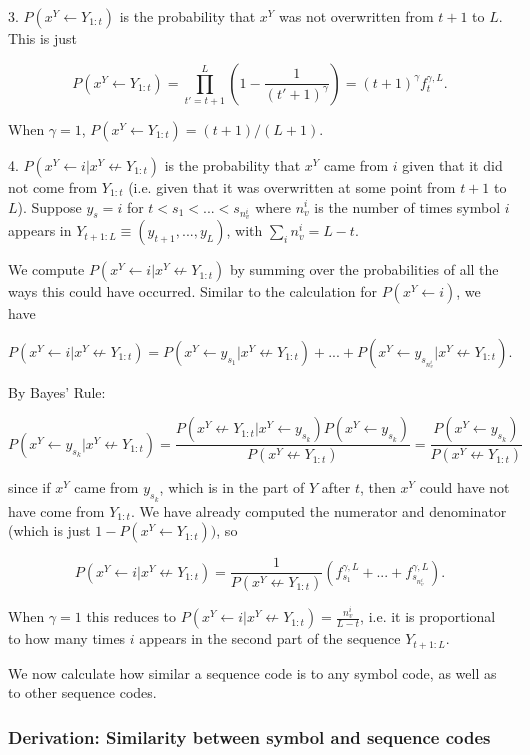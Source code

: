 \documentclass{article}
\begin{document}
3. $P(x^Y \leftarrow Y_{1:t})$ is the probability that $x^Y$ was not overwritten from $t+1$ to $L$. This is just

$$P(x^Y \leftarrow Y_{1:t}) = \prod\limits_{t' = t+1}^L \left(1 - \frac{1}{(t'+1)^\gamma}\right) = (t+1)^\gamma f^{\gamma,L}_t.$$

When $\gamma = 1$, $P(x^Y \leftarrow Y_{1:t}) = (t+1)/(L+1)$.

4. $P(x^Y \leftarrow i|x^Y \not \leftarrow Y_{1:t})$ is the probability that $x^Y$ came from $i$ given that it did not come from $Y_{1:t}$ (i.e. given that it was overwritten at some point from $t+1$ to $L$). Suppose $y_s = i$ for $t < s_1 < ... < s_{n^i_v}$ where $n^i_v$ is the number of times symbol $i$ appears in $Y_{t+1:L} \equiv (y_{t+1}, ..., y_L)$, with $\sum\limits_i n^i_v = L-t$.

We compute $P(x^Y \leftarrow i|x^Y \not \leftarrow Y_{1:t})$ by summing over the probabilities of all the ways this could have occurred. Similar to the calculation for $P(x^Y \leftarrow i)$, we have

$$P(x^Y \leftarrow i|x^Y \not \leftarrow Y_{1:t}) = P(x^Y \leftarrow y_{s_1}| x^Y \not \leftarrow Y_{1:t}) + ... + P(x^Y \leftarrow y_{s_{n^i_v}}| x^Y \not \leftarrow Y_{1:t}).$$

By Bayes' Rule:

$$P(x^Y \leftarrow y_{s_k}| x^Y \not \leftarrow Y_{1:t}) = \frac{P(x^Y \not \leftarrow Y_{1:t}| x^Y \leftarrow y_{s_k})P(x^Y \leftarrow y_{s_k})}{P(x^Y \not\leftarrow Y_{1:t})} = \frac{P(x^Y \leftarrow y_{s_k})}{P(x^Y \not\leftarrow Y_{1:t})}$$

since if $x^Y$ came from $y_{s_k}$, which is in the part of $Y$ after $t$, then $x^Y$ could have not have come from $Y_{1:t}$. We have already computed the numerator and denominator (which is just $1 - P(x^Y \leftarrow Y_{1:t}))$, so

$$P(x^Y \leftarrow i|x^Y \not \leftarrow Y_{1:t}) = \frac{1}{P(x^Y \not\leftarrow Y_{1:t})}\left( f^{\gamma,L}_{s_1} + ... + f^{\gamma,L}_{s_{n^i_v}} \right).$$

When $\gamma = 1$ this reduces to $P(x^Y \leftarrow i|x^Y \not \leftarrow Y_{1:t}) = \frac{n^i_v}{L-t}$, i.e. it is proportional to how many times $i$ appears in the second part of the sequence $Y_{t+1:L}$.

We now calculate how similar a sequence code is to any symbol code, as well as to other sequence codes.

\subsubsection{Derivation: Similarity between symbol and sequence codes}
\end{document}
